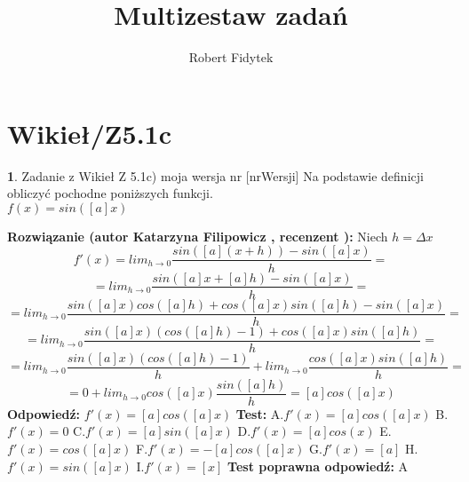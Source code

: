 \documentclass[12pt, a4paper]{article}
\title{Multizestaw zadań}
\author{Robert Fidytek}
\date{}
\theoremstyle{definition} %
\newtheorem{zad}{}
\newcommand{\kategoria}[1]{\section{#1}} %
\newcommand{\zadStart}[1]{\begin{zad}#1\newline} %
\newcommand{\zadStop}{\end{zad}}   %
\newcommand{\rozwStart}[2]{\noindent \textbf{Rozwiązanie (autor #1 , recenzent #2): }\newline} %
\newcommand{\rozwStop}{\newline}                                            %
\newcommand{\odpStart}{\noindent \textbf{Odpowiedź:}\newline}    %
\newcommand{\odpStop}{\newline}                                             %
\newcommand{\testStart}{\noindent \textbf{Test:}\newline} %
\newcommand{\testStop}{\newline} %
\newcommand{\kluczStart}{\noindent \textbf{Test poprawna odpowiedź:}\newline} %
\newcommand{\kluczStop}{\newline} %
\begin{document}
\maketitle


\kategoria{Wikieł/Z5.1c}
\zadStart{Zadanie z Wikieł Z 5.1c) moja wersja nr [nrWersji]}
Na podstawie definicji obliczyć pochodne poniższych funkcji.\\
 $f(x)=sin([a]x)$
\zadStop
\rozwStart{Katarzyna Filipowicz}{}
Niech $h=\Delta x$
$$
f'(x)=lim_{h\rightarrow 0} \frac{sin([a](x+h))-sin([a]x)}{h}=
$$ $$
=lim_{h\rightarrow 0} \frac{sin([a]x+[a]h)-sin([a]x)}{h}=
$$ $$
=lim_{h\rightarrow 0} \frac{sin([a]x)cos([a]h)+cos([a]x)sin([a]h)-sin([a]x)}{h}=
$$ $$
=lim_{h\rightarrow 0} \frac{sin([a]x)(cos([a]h)-1)+cos([a]x)sin([a]h)}{h}=
$$ $$
=lim_{h\rightarrow 0} \frac{sin([a]x)(cos([a]h)-1)}{h}+lim_{h\rightarrow 0} \frac{cos([a]x)sin([a]h)}{h}=
$$ $$
=0+lim_{h\rightarrow 0} cos([a]x)\frac{sin([a]h)}{h}=[a]cos([a]x)
$$
\rozwStop
\odpStart
$f'(x)=[a]cos([a]x)$
\odpStop
\testStart
A.$f'(x)=[a]cos([a]x)$
B.$f'(x)=0$
C.$f'(x)=[a]sin([a]x)$
D.$f'(x)=[a]cos(x)$
E.$f'(x)=cos([a]x)$
F.$f'(x)=-[a]cos([a]x)$
G.$f'(x)=[a]$
H.$f'(x)=sin([a]x)$
I.$f'(x)=[x]$
\testStop
\kluczStart
A
\kluczStop
\end{document}
